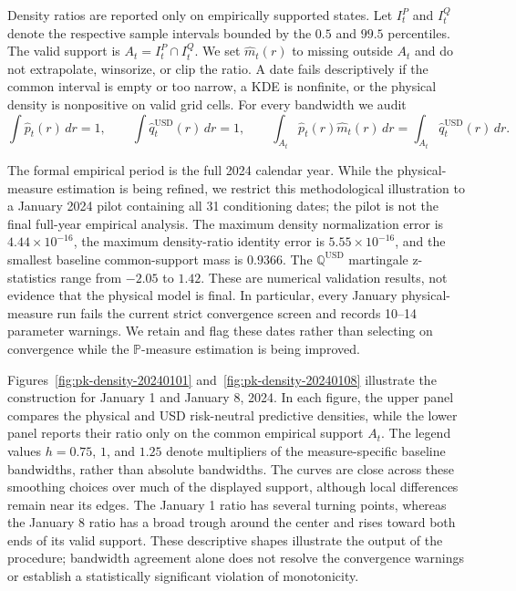 Density ratios are reported only on empirically supported states. Let
$I^P_t$ and $I^Q_t$ denote the respective sample intervals bounded by the
$0.5$ and $99.5$ percentiles. The valid support is
$A_t=I^P_t\cap I^Q_t$. We set $\widehat m_t(r)$ to missing outside $A_t$ and
do not extrapolate, winsorize, or clip the ratio. A date fails descriptively if
the common interval is empty or too narrow, a KDE is nonfinite, or the
physical density is nonpositive on valid grid cells. For every bandwidth we
audit
\begin{equation}
 \int \widehat p_t(r)\,dr=1,\qquad
 \int \widehat q^{\mathrm{USD}}_t(r)\,dr=1,\qquad
 \int_{A_t}\widehat p_t(r)\widehat m_t(r)\,dr
 =\int_{A_t}\widehat q^{\mathrm{USD}}_t(r)\,dr.
 \label{eq:pk-numerical-audit}
\end{equation}

The formal empirical period is the full 2024 calendar year. While the
physical-measure estimation is being refined, we restrict this methodological
illustration to a January 2024 pilot containing all 31 conditioning dates;
the pilot is not the final full-year empirical analysis. The maximum density
normalization error is $4.44\times10^{-16}$, the maximum density-ratio identity
error is $5.55\times10^{-16}$, and the smallest baseline common-support mass is
$0.9366$. The $\mathbb{Q}^{\mathrm{USD}}$ martingale z-statistics range from $-2.05$ to
$1.42$. These are numerical validation results, not evidence that the physical
model is final. In particular, every January physical-measure run fails the
current strict convergence screen and records 10--14 parameter warnings. We retain
and flag these dates rather than selecting on convergence while the
$\mathbb{P}$-measure estimation is being improved.

Figures~\ref{fig:pk-density-20240101} and~\ref{fig:pk-density-20240108}
illustrate the construction for January 1 and January 8, 2024. In each figure,
the upper panel compares the physical and USD risk-neutral predictive
densities, while the lower panel reports their ratio only on the common
empirical support $A_t$. The legend values $h=0.75$, $1$, and $1.25$ denote
multipliers of the measure-specific baseline bandwidths, rather than absolute
bandwidths. The curves are close across these smoothing choices over much of
the displayed support, although local differences remain near its edges.
The January 1 ratio has several turning points, whereas the January 8 ratio
has a broad trough around the center and rises toward both ends of its valid
support. These descriptive shapes illustrate the output of the procedure;
bandwidth agreement alone does not resolve the convergence warnings or
establish a statistically significant violation of monotonicity.

